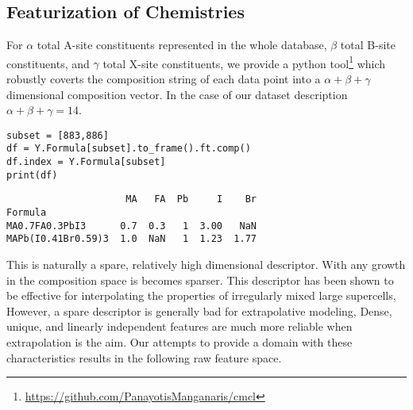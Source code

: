 \documentclass[aip, jmp, amsmath, amssymb]{revtex4-2}
\begin{document}
\subsection*{Featurization of Chemistries}
\label{sec:org86c1cb2}
For \(\alpha\) total A-site constituents represented in the whole
database, \(\beta\) total B-site constituents, and \(\gamma\) total X-site
constituents, we provide a python tool\footnote{\url{https://github.com/PanayotisManganaris/cmcl}\label{org9d357fc}} which robustly coverts
the composition string of each data point into a \(\alpha + \beta +
\gamma\) dimensional composition vector. In the case of our dataset
description\cite{yang-2022-high-throug} \(\alpha + \beta + \gamma =
14\). 

\begin{lstlisting}
subset = [883,886]
df = Y.Formula[subset].to_frame().ft.comp()
df.index = Y.Formula[subset]
print(df)
\end{lstlisting}

\begin{verbatim}
                     MA   FA  Pb     I    Br
Formula                                     
MA0.7FA0.3PbI3      0.7  0.3   1  3.00   NaN
MAPb(I0.41Br0.59)3  1.0  NaN   1  1.23  1.77
\end{verbatim}

This is naturally a spare, relatively high dimensional
descriptor. With any growth in the composition space is becomes
sparser. This descriptor has been shown to be effective for
interpolating the properties of irregularly mixed large
supercells\cite{mannodi-kanakkithodi-2022-data-driven}, However, a
spare descriptor is generally bad for extrapolative
modeling\cite{ghiringhelli-2015-big-data}, Dense, unique, and linearly
independent features are much more reliable when extrapolation is the
aim\cite{lux-2020-inter-spars}. Our attempts to provide a domain with
these characteristics results in the following raw feature space.
\end{document}
